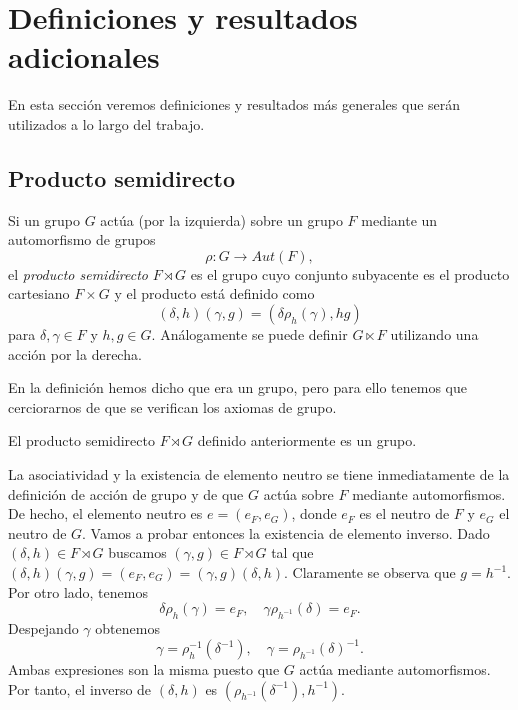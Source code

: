 \documentclass[TFG.tex]{subfiles}
\begin{document}
\section{Definiciones y resultados adicionales}


En esta sección veremos definiciones y resultados más generales  que serán utilizados a lo largo del trabajo. 
\subsection{Producto semidirecto}

\begin{defi}
Si un grupo $G$ actúa (por la izquierda) sobre un grupo $F$ mediante un automorfismo de grupos
\[
\rho: G\to Aut(F),
\]
el \emph{producto semidirecto} $F\rtimes G$ es el grupo cuyo conjunto subyacente es el producto cartesiano $F\times G$ y el producto está definido como 
\[
(\delta,h)(\gamma,g)=(\delta\rho_h(\gamma),hg)
\]
para $\delta,\gamma\in F$ y $h,g\in G$. Análogamente se puede definir $G\ltimes F$ utilizando una acción por la derecha. 
\end{defi}

En la definición hemos dicho que era un grupo, pero para ello tenemos que cerciorarnos de que se verifican los axiomas de grupo.

\begin{prop}
El producto semidirecto $F\rtimes G$ definido anteriormente es un grupo.
\end{prop}
\begin{dem}
La asociatividad y la existencia de elemento neutro se tiene inmediatamente de la definición de acción de grupo y de que $G$ actúa sobre $F$ mediante automorfismos. De hecho, el elemento neutro es $e=(e_F,e_G)$, donde $e_F$ es el neutro de $F$ y $e_G$ el neutro de $G$. Vamos a probar entonces la existencia de elemento inverso. Dado $(\delta,h)\in F\rtimes G$ buscamos $(\gamma,g)\in F\rtimes G$ tal que $(\delta,h)(\gamma,g)=(e_F,e_G)=(\gamma,g)(\delta,h)$. Claramente se observa que $g=h^{-1}$. Por otro lado, tenemos
\[
\delta\rho_h(\gamma)=e_F, \quad \gamma \rho_{h^{-1}}(\delta)=e_F.
\]
Despejando $\gamma$ obtenemos
\[
\gamma=\rho_{h}^{-1}(\delta^{-1}),\quad \gamma=\rho_{h^{-1}}(\delta)^{-1}.
\]
Ambas expresiones son la misma puesto que $G$ actúa mediante automorfismos. Por tanto, el inverso de $(\delta,h)$ es $(\rho_{h^{-1}}(\delta^{-1}), h^{-1})$. \QED
\end{dem}
\end{document}
